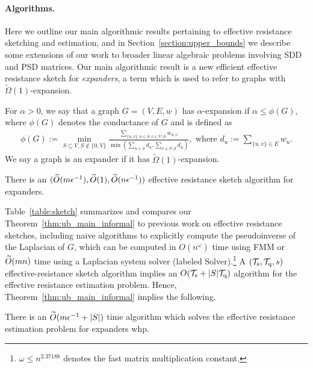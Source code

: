 \paragraph{Algorithms.} { Here we outline our main algorithmic results pertaining to effective resistance sketching and estimation, and in Section~\ref{section:upper_bounds} we describe some extensions of our work to broader linear algebraic problems involving SDD and PSD matrices. Our main algorithmic result is a new efficient effective resistance sketch for \textit{expanders}, a term which is used to refer to graphs with $\widetilde{\Omega}(1)$-expansion. 

\begin{definition}[Expander]\label{def:expander} For $\alpha > 0$, we say that a graph $G = (V, E, w)$ has $\alpha$-expansion if $\alpha \leq \phi(G)$, where $\phi(G)$ denotes the conductance of $G$ and is defined as
\begin{align*}
    \phi(G) := \min_{S \subseteq V, S\notin \{0, V\}} \frac{\sum_{\{u, v\} : u \in S, v \in V\setminus{S}} w_{u, v}}{\min\left(\sum_{u \in S} d_u, \sum_{v \in V\setminus{S}} d_u\right)}, \text{ where } d_u := \sum_{\{u, v\} \in E} w_u.
\end{align*}
We say a graph is an expander if it has $\widetilde{\Omega}(1)$-expansion. 
\end{definition}

\begin{theorem}\label{thm:ub_main_informal} There is an $(\widetilde{O}( {m\epsilon^{-1}} ), \widetilde{O}( {1} ), \widetilde{O}( {n\epsilon^{-1}} ))$ effective resistance sketch algorithm for expanders.
\end{theorem}
}

Table~\ref{table:sketch} summarizes and compares our Theorem~\ref{thm:ub_main_informal} to previous work on effective resistance sketches, including naive algorithms to explicitly compute the pseudoinverse of the Laplacian of $G$, which can be computed in $O(n^\omega)$ time using FMM or $\widetilde{O}( {mn} )$ time using a Laplacian system solver (labeled Solver).\footnote{$\omega \leq n^{2.37188}$ \cite{duan2023faster} denotes the fast matrix multiplication constant. } A $(\mathcal{T}_{\mathrm{s}}, \mathcal{T}_{\mathrm{q}}, s)$
effective-resistance sketch algorithm implies an $O(\mathcal{T}_{\mathrm{s}} + |S| \mathcal{T}_{\mathrm{q}} )$ algorithm for the effective resistance estimation problem. Hence, Theorem~\ref{thm:ub_main_informal} implies the following. 
\begin{theorem} \label{thm:ub_main_informal2} There is an $\widetilde{O}( {m\epsilon^{-1} + |S|} )$ time algorithm which solves the effective resistance estimation problem for expanders whp.
\end{theorem}

